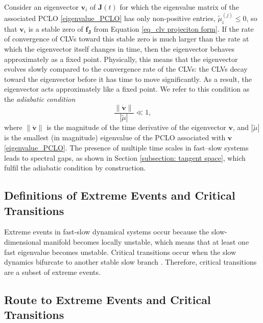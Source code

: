 \documentclass[aps,reprint,prx]{revtex4-2}
\begin{document}
Consider an eigenvector \( \mathbf{v}_i \) of \( \mathbf{J}(t) \) for which the eigenvalue matrix of the associated PCLO \eqref{eigenvalue_PCLO} has only non-positive entries, \( \tilde{\mu}_i^{(j)} \leq 0 \), so that \( \mathbf{v}_i \) is a stable zero of \( \mathbf{f}_{\mathbf{J}} \) from Equation \eqref{eq_clv projeciton form}. {If the rate of convergence} of CLVs toward this stable zero is much larger than the rate at which the eigenvector itself changes in time, then the eigenvector behaves approximately as a fixed point.
    Physically, this means that the eigenvector evolves slowly compared to the {convergence rate} of the CLVs: the CLVs decay toward the eigenvector before it has time to move significantly. As a result, the eigenvector acts approximately like a fixed point. We refer to this condition as the \textit{adiabatic condition}
\begin{equation} \label{adiabatic condition}
    \frac{\lVert \dot{\mathbf{v}} \rVert}{|\tilde{\mu}|} \ll 1,
\end{equation}
where \( \lVert \dot{\mathbf{v}} \rVert \) is the magnitude of the time derivative of the eigenvector \( \mathbf{v} \), and \( |\tilde{\mu}| \) is the smallest (in magnitude) eigenvalue of the PCLO associated with \( \mathbf{v} \) \eqref{eigenvalue_PCLO}. {The presence of multiple time scales in fast–slow systems leads to spectral gaps, as shown in Section \ref{subsection: tangent space}, which fulfil the adiabatic condition by construction.}  

\subsection{Definitions of Extreme Events and Critical Transitions} \label{sec: definition of extreme event}
Extreme events in fast-slow dynamical systems occur because the slow-dimensional manifold \cite{farazmandExtremeEventsMechanisms2019} becomes locally unstable, which means that at least one fast {eigenvalue becomes unstable}. Critical transitions occur when the slow dynamics bifurcate to another stable slow branch \cite{schefferEarlywarningSignalsCritical2009, schefferAnticipatingCriticalTransitions2012}. {Therefore, critical transitions are a subset of extreme events.}

\subsection{Route to Extreme Events and Critical Transitions} \label{dynamical_regimes}
\end{document}
